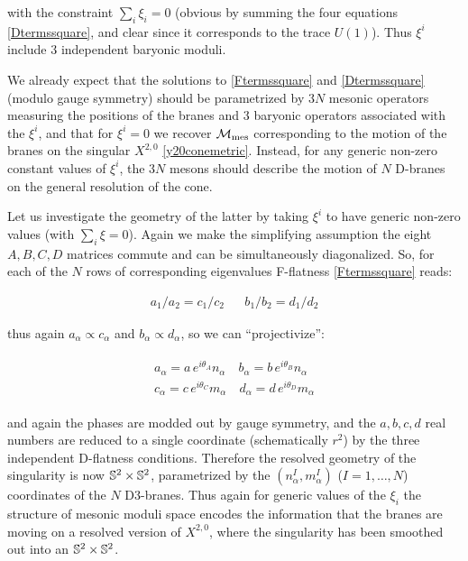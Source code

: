 with the constraint $\sum_i \xi_i = 0$ (obvious by summing the four equations \eqref{Dtermssquare}, and clear since it corresponds to the trace $U(1)$). Thus $\xi^i$ include $3$ independent baryonic moduli.

We already expect that the solutions to \eqref{Ftermssquare} and \eqref{Dtermssquare} (modulo gauge symmetry) should be parametrized by $3N$ mesonic operators measuring the positions of the branes and $3$ baryonic operators associated with the $\xi^i$, and that for $\xi^i = 0$ we recover $\mathcal{M}_\mathrm{mes}$ corresponding to the motion of the branes on the singular $X^{2,0}$ \eqref{y20conemetric}. Instead, for any generic non-zero constant values of $\xi^i$, the $3N$ mesons should describe the motion of $N$ D-branes on the general resolution of the cone. 

Let us investigate the geometry of the latter by taking $\xi^i$ to have generic non-zero values (with $\sum_i \xi = 0$). Again we make the simplifying assumption the eight $A, B, C, D$ matrices commute and can be simultaneously diagonalized. So, for each of the $N$ rows of corresponding eigenvalues F-flatness \eqref{Ftermssquare} reads:

\begin{align}
	a_1/a_2 = c_1/c_2 && b_1/b_2 = d_1 / d_2
	\label{}
\end{align}

thus again $a_\alpha \propto c_\alpha$ and $b_\alpha \propto d_\alpha$, so we can ``projectivize'':

\begin{align}\begin{split}
		a_\alpha = a \, e^{i\theta_A} n_\alpha \quad b_\alpha = b \, e^{i\theta_B} n_\alpha \\
		c_\alpha = c \, e^{i\theta_C} m_\alpha \quad d_\alpha = d \, e^{i\theta_D} m_\alpha 
	\end{split}\end{align}

and again the phases are modded out by gauge symmetry, and the $a, b, c, d$ real numbers are reduced to a single coordinate (schematically $r^2$) by the three independent D-flatness conditions. Therefore the resolved geometry of the singularity is now $\mathbb{S}^2 \times \mathbb{S}^2$, parametrized by the $(n^I_\alpha,m^I_\alpha)$ ($I=1,\ldots,N$) coordinates of the $N$ D3-branes. Thus again for generic values of the $\xi_i$ the structure of mesonic moduli space encodes the information that the branes are moving on a resolved version of $X^{2,0}$, where the singularity has been smoothed out into an $\mathbb{S}^2 \times \mathbb{S}^2$.

